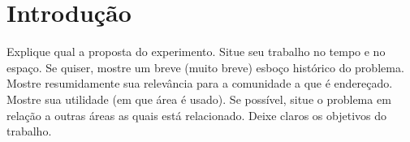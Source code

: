 \newpage

\section{Introdução}
Explique qual a proposta do experimento. Situe seu trabalho no tempo e no espaço. Se quiser, mostre um breve (muito breve) esboço histórico do problema. Mostre resumidamente sua relevância para a comunidade a que é endereçado. Mostre sua utilidade (em que área é usado). Se possível, situe o problema em relação a outras áreas as quais está relacionado. Deixe claros os objetivos do trabalho.
